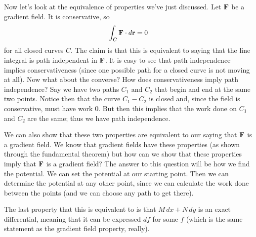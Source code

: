Now let's look at the equivalence of properties we've just discussed. Let $\boldsymbol{\mathbf{F}}$ be a gradient field. It is conservative, so
\[ \int_C \boldsymbol{\mathbf{F}} \cdot d\boldsymbol{\mathbf{r}} = 0 \]
for all closed curves $C$. The claim is that this is equivalent to saying that the line integral is path independent in $\boldsymbol{\mathbf{F}}$. It is easy to see that path independence implies conservativeness (since one possible path for a closed curve is not moving at all). Now what about the converse? How does conservativeness imply path independence? Say we have two paths $C_1$ and $C_2$ that begin and end at the same two points. Notice then that the curve $C_1 - C_2$ is closed and, since the field is conservative, must have work 0. But then this implies that the work done on $C_1$ and $C_2$ are the same; thus we have path independence. 

We can also show that these two properties are equivalent to our saying that $\boldsymbol{\mathbf{F}}$ is a gradient field. We know that gradient fields have these properties (as shown through the fundamental theorem) but how can we show that these properties imply that $\boldsymbol{\mathbf{F}}$ is a gradient field? The answer to this question will be how we find the potential. We can set the potential at our starting point. Then we can determine the potential at any other point, since we can calculate the work done between the points (and we can choose any path to get there). 

The last property that this is equivalent to is that $M\,dx + N\,dy$ is an exact differential, meaning that it can be expressed $df$ for some $f$ (which is the same statement as the gradient field property, really). 